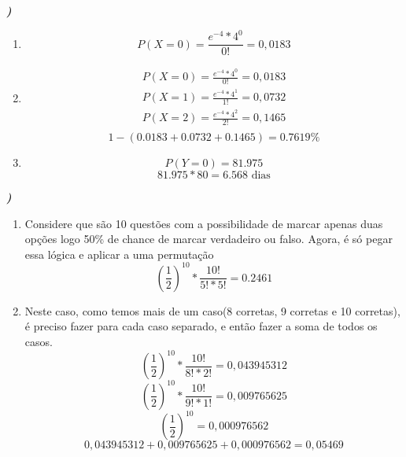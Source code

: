 \documentclass[12pt]{article}
\newcounter{instn}
\newcommand{\instnum}{\arabic{instn}}
\newcommand{\myline}[1]{
    \emph{\textbf{#1)}}
    \addtocounter{instn}{1}
}
\newenvironment{question}
 {
    \myline{\instnum} 
    }
    {
 }
\begin{document}
    \begin{question}
        \begin{enumerate}[label={\textbf{\alph*)}}]
            \item        
            \begin{equation}
                P(X=0) = \frac{e^{-4}*4^{0}}{0!} = 0,0183
            \end{equation}
            \item
            \begin{align*}
                P(X=0) = \frac{e^{-4}*4^{0}}{0!} = 0,0183 \\ 
                P(X=1) = \frac{e^{-4}*4^{1}}{1!} = 0,0732 \\ 
                P(X=2) = \frac{e^{-4}*4^{2}}{2!} = 0,1465 \\
            \end{align*}
            \begin{equation}
                1 - (0.0183 + 0.0732 + 0.1465) = 0.7619\%
            \end{equation}
            \item  
            \[
                P(Y=0) = 81.975
            \] 
            \begin{equation}
                81.975 * 80 = \text{6.568 dias}
            \end{equation}
        \end{enumerate}
    \end{question}


    \begin{question}
        \begin{enumerate}[label={\textbf{\alph*)}}]
            \item Considere que são 10 questões com a possibilidade de marcar apenas duas opções
            logo 50\% de chance de marcar verdadeiro ou falso. Agora, é só pegar essa lógica e aplicar a uma permutação
            \begin{equation}
                (\frac{1}{2})^{10} * \frac{10!}{5!*5!} = 0.2461
            \end{equation}
            \item Neste caso, como temos mais de um caso(8 corretas, 9 corretas e 10 corretas), é preciso fazer para cada caso 
            separado, e então fazer a soma de todos os casos.
            \[
                (\frac{1}{2})^{10} * \frac{10!}{8!*2!} = 0,043945312
            \]
            \[
                (\frac{1}{2})^{10} * \frac{10!}{9!*1!} = 0,009765625
            \]
            \[
                (\frac{1}{2})^{10} = 0,000976562
            \]
            \begin{equation}
                0,043945312 + 0,009765625 + 0,000976562 = 0,05469
            \end{equation}
        \end{enumerate}

    \end{question}
\end{document}
